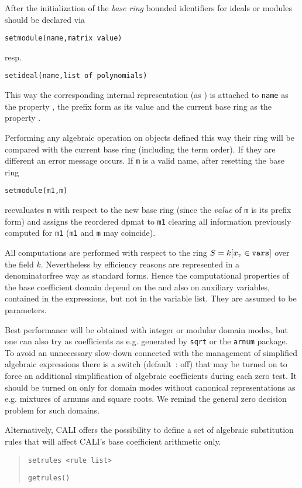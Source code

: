 After the initialization of the {\em base ring} bounded identifiers
for ideals or modules should be declared via
\begin{verbatim}
setmodule(name,matrix value)
\end{verbatim}
resp.
\begin{verbatim}
setideal(name,list of polynomials)
\end{verbatim}
This way the corresponding internal representation (as )
is attached to {\tt name} as the property , the prefix
form as its value and the current base ring as the property
.

Performing any algebraic operation on objects defined this way their
ring will be compared with the current base ring (including the term
order). If they are different an error message occurs. If {\tt m} is
a valid name, after resetting the base ring
\begin{verbatim}
setmodule(m1,m)
\end{verbatim}
reevaluates {\tt m} with respect to the new base ring (since the
{\em value} of {\tt m} is its prefix form) and assigns the reordered
dpmat to {\tt m1} clearing all information previously computed for
{\tt m1} ({\tt m1} and {\tt m} may coincide).

All computations are performed with respect to the ring $S=k[x_v\in
{\tt vars}]$ over the field $k$. Nevertheless by efficiency reasons
 are represented in a denominatorfree way as
standard forms. Hence the computational properties of the base
coefficient domain depend on the  and also on auxiliary
variables, contained in the expressions, but not in the variable
list. They are assumed to be parameters. 

Best performance will be obtained with integer or modular domain
modes, but one can also try  as coefficients
as e.g. generated by {\tt sqrt} or the {\tt arnum} package. To avoid
an unnecessary slow-down connected with the management of simplified
algebraic expressions there is a switch  (default~:
off) that may be turned on to force an additional simplification of
algebraic coefficients during each zero test. It should be turned on
only for domain modes without canonical representations as e.g.
mixtures of arnums and square roots. We remind the general zero
decision problem for such domains. 

Alternatively, CALI offers the possibility to define a set of
algebraic substitution rules that will affect CALI's base coefficient
arithmetic only. 
\begin{quote}
\verb|setrules <rule list>|


\verb|getrules()|

\end{quote}

